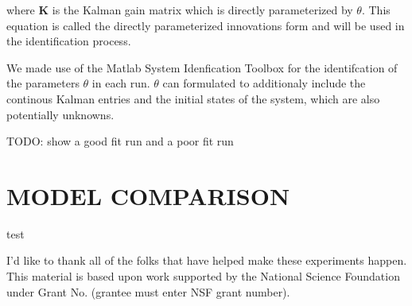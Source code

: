 \documentclass[twocolumn,10pt]{asme2e}
\begin{document}
where $\mathbf{K}$ is the Kalman gain matrix which is directly parameterized by
$\theta$. This equation is called the directly parameterized innovations form
and will be used in the identification process.

We made use of the Matlab System Idenfication Toolbox for the identifcation of
the parameters $\theta$ in each run. $\theta$ can formulated to additionaly
include the continous Kalman entries and the initial states of the system,
which are also potentially unknowns.

TODO: show a good fit run and a poor fit run

\section*{MODEL COMPARISON}
test

\begin{acknowledgment}
	I'd like to thank all of the folks that have helped make these experiments
	happen. This material is based upon work supported by the National Science
	Foundation under Grant No. (grantee must enter NSF grant number).
\end{acknowledgment}



\end{document}
